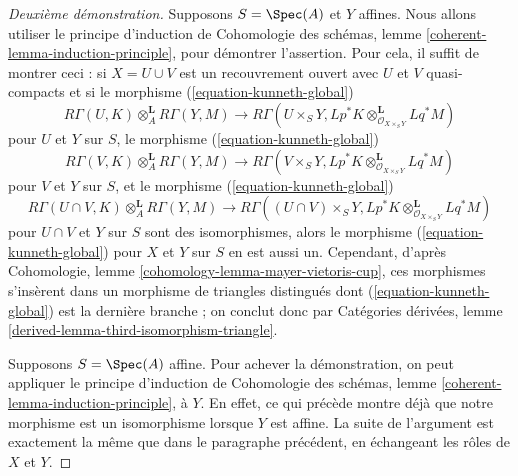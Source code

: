 \begin{proof}[Deuxième démonstration]
\medskip\noindent
Supposons $S = \Spec(A)$ et $Y$ affines. Nous allons utiliser le principe
d'induction de
Cohomologie des schémas, lemme \ref{coherent-lemma-induction-principle},
pour démontrer l'assertion. Pour cela, il suffit de montrer ceci :
si $X = U \cup V$ est un recouvrement ouvert avec $U$ et $V$ quasi-compacts
et si le morphisme (\ref{equation-kunneth-global})
$$
R\Gamma(U, K) \otimes_A^\mathbf{L} R\Gamma(Y, M)
\longrightarrow
R\Gamma(U \times_S Y,
Lp^*K \otimes_{\mathcal{O}_{X \times_S Y}}^\mathbf{L} Lq^*M)
$$
pour $U$ et $Y$ sur $S$, le morphisme (\ref{equation-kunneth-global})
$$
R\Gamma(V, K) \otimes_A^\mathbf{L} R\Gamma(Y, M)
\longrightarrow
R\Gamma(V \times_S Y,
Lp^*K \otimes_{\mathcal{O}_{X \times_S Y}}^\mathbf{L} Lq^*M)
$$
pour $V$ et $Y$ sur $S$, et le morphisme (\ref{equation-kunneth-global})
$$
R\Gamma(U \cap V, K) \otimes_A^\mathbf{L} R\Gamma(Y, M)
\longrightarrow
R\Gamma((U \cap V) \times_S Y,
Lp^*K \otimes_{\mathcal{O}_{X \times_S Y}}^\mathbf{L} Lq^*M)
$$
pour $U \cap V$ et $Y$ sur $S$ sont des isomorphismes, alors le morphisme
(\ref{equation-kunneth-global}) pour $X$ et $Y$ sur $S$ en est aussi un.
Cependant, d'après Cohomologie, lemme \ref{cohomology-lemma-mayer-vietoris-cup},
ces morphismes s'insèrent dans un morphisme de triangles distingués dont
(\ref{equation-kunneth-global}) est la dernière branche ; on conclut donc
par Catégories dérivées, lemme \ref{derived-lemma-third-isomorphism-triangle}.

\medskip\noindent
Supposons $S = \Spec(A)$ affine. Pour achever la démonstration, on peut appliquer
le principe d'induction de
Cohomologie des schémas, lemme \ref{coherent-lemma-induction-principle},
à $Y$. En effet, ce qui précède montre déjà que notre morphisme est
un isomorphisme lorsque $Y$ est affine. La suite de l'argument est
exactement la même que dans le paragraphe précédent, en échangeant les rôles de
$X$ et $Y$.
\end{proof}

